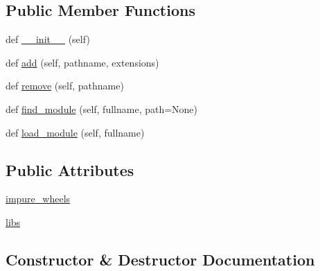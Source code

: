 \subsection*{Public Member Functions}
\begin{DoxyCompactItemize}
\item 
def \hyperlink{classpip_1_1__vendor_1_1distlib_1_1wheel_1_1Mounter_a365b267610efc481d9072ba109154086}{\+\_\+\+\_\+init\+\_\+\+\_\+} (self)
\item 
def \hyperlink{classpip_1_1__vendor_1_1distlib_1_1wheel_1_1Mounter_ac9bb94a1cb0d08a857ec40c605a94b63}{add} (self, pathname, extensions)
\item 
def \hyperlink{classpip_1_1__vendor_1_1distlib_1_1wheel_1_1Mounter_ae270d33cf0dad615cf09ce06ffbeda0e}{remove} (self, pathname)
\item 
def \hyperlink{classpip_1_1__vendor_1_1distlib_1_1wheel_1_1Mounter_a918a2c164371b956085fcaf49b7a9f45}{find\+\_\+module} (self, fullname, path=None)
\item 
def \hyperlink{classpip_1_1__vendor_1_1distlib_1_1wheel_1_1Mounter_af38343d58a8458c1995a3076fc23cd2a}{load\+\_\+module} (self, fullname)
\end{DoxyCompactItemize}
\subsection*{Public Attributes}
\begin{DoxyCompactItemize}
\item 
\hyperlink{classpip_1_1__vendor_1_1distlib_1_1wheel_1_1Mounter_a68e5293b9e56b8a24cb6eaba9153c341}{impure\+\_\+wheels}
\item 
\hyperlink{classpip_1_1__vendor_1_1distlib_1_1wheel_1_1Mounter_a90ca414fe31f55f18181337f48d8698d}{libs}
\end{DoxyCompactItemize}


\subsection{Constructor \& Destructor Documentation}
\mbox{\label{classpip_1_1__vendor_1_1distlib_1_1wheel_1_1Mounter_a365b267610efc481d9072ba109154086}} 
